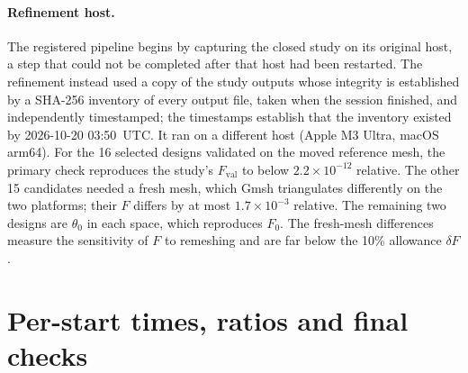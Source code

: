 \documentclass{anvil-paper}
\begin{document}
\paragraph{Refinement host.}
The registered pipeline begins by capturing the closed study on its
original host, a step that could not be completed after that host had been
restarted. The refinement instead used a copy of the study outputs whose
integrity is established by a SHA-256 inventory of every output file, taken
when the session finished, and independently timestamped; the timestamps
establish that the inventory existed by 2026-10-20 03:50~UTC. It ran on a different host (Apple M3 Ultra,
macOS arm64). For the 16 selected designs validated on the moved reference
mesh, the primary check reproduces the study's $F_{\mathrm{val}}$ to below
$2.2\times10^{-12}$ relative. The other 15 candidates needed a fresh mesh,
which Gmsh triangulates differently on the two platforms; their $F$
differs by at most $1.7\times10^{-3}$ relative. The remaining two designs
are $\theta_0$ in each space, which reproduces $F_0$. The fresh-mesh
differences measure the sensitivity of $F$ to remeshing and are far below
the 10\% allowance $\delta F$.


\section{Per-start times, ratios and final checks}\label{sec:exp2-times}
\begin{table}[H]\centering\small
\caption{Charged wall-time units to the first attaining validation,
repeat~1. A dash means the target was not attained within 120 units.
$T_{99}$ was attained by no run in S8.}
\label{tab:exp2-time}
\end{table}

\begin{table}[H]\centering\small
\caption{Paired per-start time ratios (repeat~1). B/A and D/E vary the
optimizer at fixed resolution; E/A and D/B vary the resolution; D/A
compares A with the coarse derivative-free competitor. Ratios above one
favor the denominator. Geometric means use the finite pairs only, so the
D/E and E/A means omit the starts where E failed to attain the target.}
\label{tab:exp2-ratios}
\end{table}

\begin{table}[H]\centering\scriptsize
\caption{Final checks of the selected designs. ``best'' marks a method's
representative; ``A $T_{90}$'' marks the earliest repeat-1 crossing of that
target by that method. The L2 column is the primary check on the
refinement host. L3 and conforming changes are in percent; the 40-angle,
tight and shifted changes are relative, in units of $10^{-4}$. ``held-out'' is the objective at currents $0.25$ and
$0.75$ relative to $\theta_0$'s at the same currents. A dash means the
conforming check does not apply because stator offsets are nonzero.}
\label{tab:exp2-refinement}
\end{table}
\end{document}
